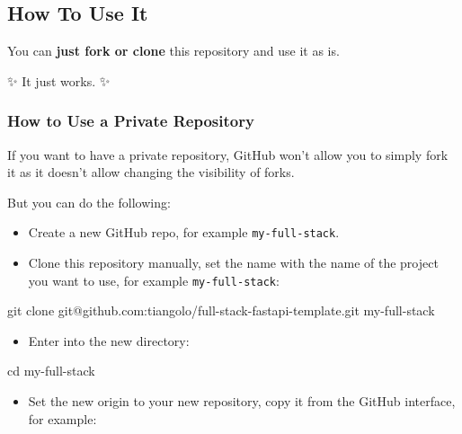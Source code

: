 \documentclass[
]{article}
\newenvironment{Shaded}{}{}
\newcommand{\BuiltInTok}[1]{#1}
\newcommand{\FunctionTok}[1]{\textcolor[rgb]{0.02,0.16,0.49}{#1}}
\newcommand{\NormalTok}[1]{#1}
\providecommand{\tightlist}{%
  \setlength{\itemsep}{0pt}\setlength{\parskip}{0pt}}
\begin{document}
\hypertarget{how-to-use-it}{%
\subsection{How To Use It}\label{how-to-use-it}}

You can \textbf{just fork or clone} this repository and use it as is.

✨ It just works. ✨

\hypertarget{how-to-use-a-private-repository}{%
\subsubsection{How to Use a Private
Repository}\label{how-to-use-a-private-repository}}

If you want to have a private repository, GitHub won't allow you to
simply fork it as it doesn't allow changing the visibility of forks.

But you can do the following:

\begin{itemize}
\tightlist
\item
  Create a new GitHub repo, for example \texttt{my-full-stack}.
\item
  Clone this repository manually, set the name with the name of the
  project you want to use, for example \texttt{my-full-stack}:
\end{itemize}

\hypertarget{cb1}{}
\begin{Shaded}
\begin{Highlighting}[]
\FunctionTok{git}\NormalTok{ clone git@github.com:tiangolo/full{-}stack{-}fastapi{-}template.git my{-}full{-}stack}
\end{Highlighting}
\end{Shaded}

\begin{itemize}
\tightlist
\item
  Enter into the new directory:
\end{itemize}

\hypertarget{cb2}{}
\begin{Shaded}
\begin{Highlighting}[]
\BuiltInTok{cd}\NormalTok{ my{-}full{-}stack}
\end{Highlighting}
\end{Shaded}

\begin{itemize}
\tightlist
\item
  Set the new origin to your new repository, copy it from the GitHub
  interface, for example:
\end{itemize}
\end{document}
